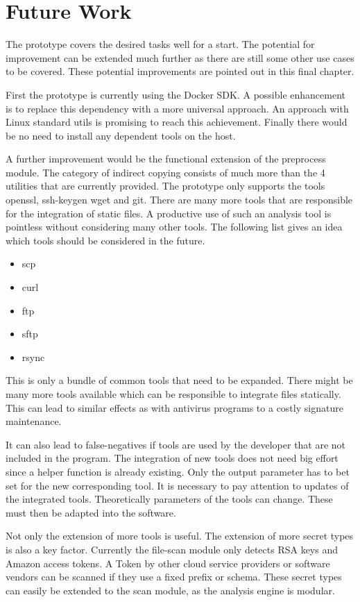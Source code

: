 \chapter{Future Work}
\label{ch:end:future}
The prototype covers the desired tasks well for a start.
The potential for improvement can be extended much further as there are still some other use cases to be covered.
These potential improvements are pointed out in this final chapter.

First the prototype is currently using the Docker SDK. 
A possible enhancement is to replace this dependency with a more universal approach. 
An approach with Linux standard utils is promising to reach this achievement.
Finally there would be no need to install any dependent tools on the host.

A further improvement would be the functional extension of the preprocess module.
The category of indirect copying consists of much more than the 4 utilities that are currently provided.
The prototype only supports the tools openssl, ssh-keygen wget and git.
There are many more tools that are responsible for the integration of static files. 
A productive use of such an analysis tool is pointless without considering many other tools.
The following list gives an idea which tools should be considered in the future.
\begin{itemize}
\item scp
\item curl
\item ftp
\item sftp
\item rsync
\end{itemize}
This is only a bundle of common tools that need to be expanded.
There might be many more tools available which can be responsible to integrate files statically.
This can lead to similar effects as with antivirus programs to a costly signature maintenance.

It can also lead to false-negatives if tools are used by the developer that are not included in the program.
The integration of new tools does not need big effort since a helper function is already existing.
Only the output parameter has to bet set for the new corresponding tool.
It is necessary to pay attention to updates of the integrated tools.
Theoretically parameters of the tools can change. 
These must then be adapted into the software.

Not only the extension of more tools is useful. The extension of more secret types is also a key factor.
Currently the file-scan module only detects RSA keys and Amazon access tokens.
A Token by other cloud service providers or software vendors can be scanned if they use a fixed prefix or schema.
These secret types can easily be extended to the scan module, as the analysis engine is modular.

